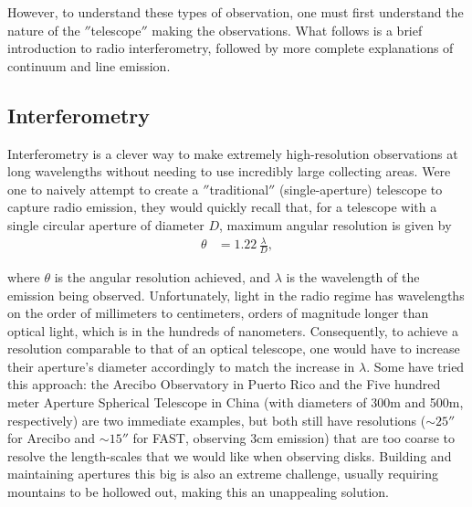 However, to understand these types of observation, one must first understand the nature of the $''$telescope$''$ making the observations. What follows is a brief introduction to radio interferometry, followed by more complete explanations of continuum and line emission.



\subsection{Interferometry}
\label{section:interferometry}
Interferometry is a clever way to make extremely high-resolution observations at long wavelengths without needing to use incredibly large collecting areas. Were one to naively attempt to create a $''$traditional$''$ (single-aperture) telescope to capture radio emission, they would quickly recall that, for a telescope with a single circular aperture of diameter $D$, maximum angular resolution is given by
\begin{align}
  \theta &= 1.22 \, \frac{\lambda}{D},
\end{align}

\noindent where $\theta$ is the angular resolution achieved, and $\lambda$ is the wavelength of the emission being observed. Unfortunately, light in the radio regime has wavelengths on the order of millimeters to centimeters, orders of magnitude longer than optical light, which is in the hundreds of nanometers. Consequently, to achieve a resolution comparable to that of an optical telescope, one would have to increase their aperture's diameter accordingly to match the increase in $\lambda$. Some have tried this approach: the Arecibo Observatory in Puerto Rico and the Five hundred meter Aperture Spherical Telescope in China (with diameters of 300m and 500m, respectively) are two immediate examples, but both still have resolutions ($\sim25''$ for Arecibo and $\sim15''$ for FAST, observing 3cm emission) that are too coarse to resolve the length-scales that we would like when observing disks. Building and maintaining apertures this big is also an extreme challenge, usually requiring mountains to be hollowed out, making this an unappealing solution.


